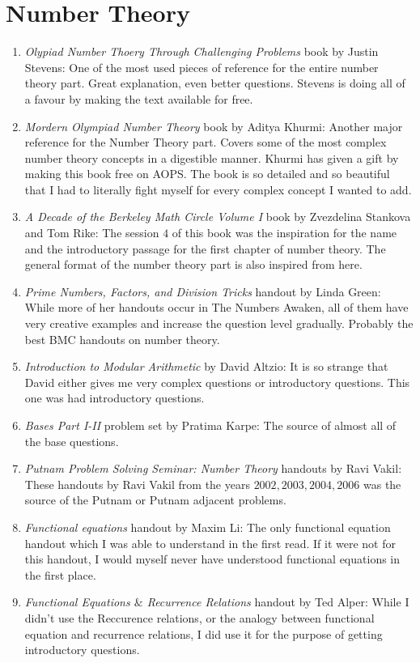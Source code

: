 \section{Number Theory}
\begin{enumerate}
    \item \emph{Olypiad Number Thoery Through Challenging Problems} book by Justin Stevens: One of the most used pieces of reference for the entire number theory part. Great explanation, even better questions. Stevens is doing all of a favour by making the text available for free.
    \item \emph{Mordern Olympiad Number Theory} book by Aditya Khurmi: Another major reference for the Number Theory part. Covers some of the most complex number theory concepts in a digestible manner. Khurmi has given a gift by making this book free on AOPS. The book is so detailed and so beautiful that I had to literally fight myself for every complex concept I wanted to add.
    \item \emph{A Decade of the Berkeley Math Circle Volume I} book by Zvezdelina Stankova and Tom Rike: The session $4$ of this book was the inspiration for the name and the introductory passage for the first chapter of number theory. The general format of the number theory part is also inspired from here.
    \item \emph{Prime Numbers, Factors, and Division Tricks} handout by Linda Green: While more of her handouts occur in The Numbers Awaken, all of them have very creative examples and increase the question level gradually. Probably the best BMC handouts on number theory.
    \item \emph{Introduction to Modular Arithmetic} by David Altzio: It is so strange that David either gives me very complex questions or introductory questions. This one was had introductory questions.
    \item \emph{Bases Part I-II} problem set by Pratima Karpe: The source of almost all of the base questions.
    \item \emph{Putnam Problem Solving Seminar: Number Theory} handouts by Ravi Vakil: These handouts by Ravi Vakil from the years $2002, 2003, 2004, 2006$ was the source of the Putnam or Putnam adjacent problems.
    \item \emph{Functional equations} handout by Maxim Li: The only functional equation handout which I was able to understand in the first read. If it were not for this handout, I would myself never have understood functional equations in the first place.
    \item \emph{Functional Equations $\&$ Recurrence Relations} handout by Ted Alper: While I didn't use the Reccurence relations, or the analogy between functional equation and recurrence relations, I did use it for the purpose of getting introductory questions.

\end{enumerate}
